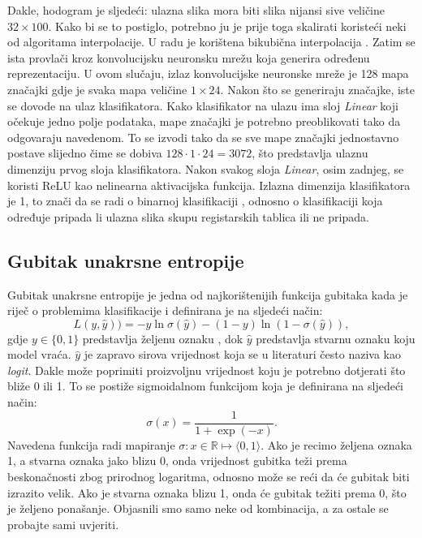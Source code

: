 \documentclass[times, utf8, diplomski]{fer}
\begin{document}
Dakle, hodogram je sljedeći: ulazna slika mora biti slika nijansi sive veličine $32\times100$. Kako bi se to postiglo, potrebno ju je prije toga skalirati koristeći neki od algoritama interpolacije. U radu je korištena bikubična interpolacija . Zatim se ista provlači kroz konvolucijsku neuronsku mrežu koja generira određenu reprezentaciju. U ovom slučaju, izlaz konvolucijske neuronske mreže je 128 mapa značajki gdje je svaka mapa veličine $1\times24$. Nakon što se generiraju značajke, iste se dovode na ulaz klasifikatora. Kako klasifikator na ulazu ima sloj \textit{Linear} koji očekuje jedno polje podataka, mape značajki je potrebno preoblikovati  tako da odgovaraju navedenom. To se izvodi tako da se sve mape značajki jednostavno postave slijedno čime se dobiva $128\cdot1\cdot24=3072$, što predstavlja ulaznu dimenziju prvog sloja klasifikatora. Nakon svakog sloja \textit{Linear}, osim zadnjeg, se koristi ReLU kao nelinearna aktivacijska funkcija. Izlazna dimenzija klasifikatora je 1, to znači da se radi o binarnoj klasifikaciji , odnosno o klasifikaciji koja određuje pripada li ulazna slika skupu registarskih tablica ili ne pripada.

\subsection{Gubitak unakrsne entropije}
Gubitak unakrsne entropije  je jedna od najkorištenijih funkcija gubitaka kada je riječ o problemima klasifikacije i definirana je na sljedeći način:
\begin{equation}
    L(y, \hat{y})) = -y\ln\sigma(\hat{y}) - (1-y)\ln(1-\sigma(\hat{y})),
    \label{eq:bce}
\end{equation}
gdje $y \in \{0,1\}$ predstavlja željenu oznaku , dok $\hat{y}$ predstavlja stvarnu oznaku  koju model vraća. $\hat{y}$ je zapravo sirova vrijednost koja se u literaturi često naziva kao \textit{logit}. Dakle može poprimiti proizvoljnu vrijednost koju je potrebno dotjerati što bliže 0 ili 1. To se postiže sigmoidalnom funkcijom koja je definirana na sljedeći način:
\begin{equation}
    \sigma(x) = \frac{1}{1 + \exp(-x)}.
\end{equation}
Navedena funkcija radi mapiranje $\sigma: x \in \mathbb{R} \mapsto \langle0,1\rangle$. Ako je recimo željena oznaka 1, a stvarna oznaka jako blizu 0, onda vrijednost gubitka teži prema beskonačnosti zbog prirodnog logaritma, odnosno može se reći da će gubitak biti izrazito velik. Ako je stvarna oznaka blizu 1, onda će gubitak težiti prema 0, što je željeno ponašanje. Objasnili smo samo neke od kombinacija, a za ostale se probajte sami uvjeriti.
\end{document}
